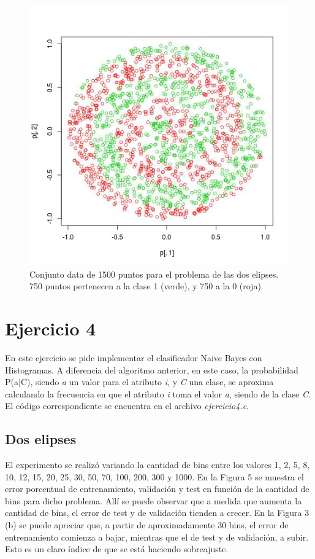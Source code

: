 \documentclass[12pt, a4paper]{article}
\begin{document}
\begin{figure}
    \centering
	\includegraphics[scale=0.35]{espirales}
	\caption{Conjunto data de 1500 puntos para el problema de las dos elipses. 750 puntos pertenecen a la clase 1 (verde), y 750 a la 0 (roja).}
\end{figure}

\section*{Ejercicio 4}

En este ejercicio se pide implementar el clasificador Naive Bayes con Histogramas. A diferencia del algoritmo anterior, en este caso, la probabilidad P(a$|$C), siendo \textit{a} un valor para el atributo \textit{i}, y \textit{C} una clase, se aproxima calculando la frecuencia en que el atributo \textit{i} toma el valor \textit{a}, siendo de la clase \textit{C}. El código correspondiente se encuentra en el archivo \textit{ejercicio4.c}.

\subsection*{Dos elipses}

El experimento se realizó variando la cantidad de bins entre los valores 1, 2, 5, 8, 10, 12, 15, 20, 25, 30, 50, 70, 100, 200, 300 y 1000. En la Figura 5 se muestra el error porcentual de entrenamiento, validación y test en función de la cantidad de bins para dicho problema. Allí se puede observar que a medida que aumenta la cantidad de bins, el error de test y de validación tienden a crecer. En la Figura 3 (b) se puede apreciar que, a partir de aproximadamente 30 bins, el error de entrenamiento comienza a bajar, mientras que el de test y de validación, a subir. Esto es un claro índice de que se está haciendo sobreajuste.
\end{document}
